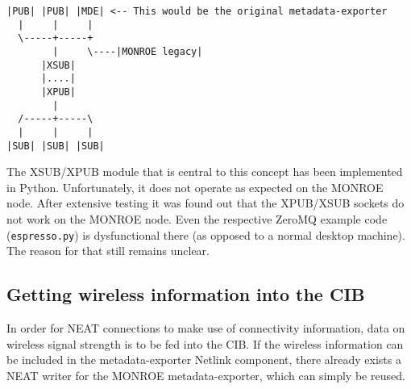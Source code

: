 \documentclass{scrartcl}
\begin{document}
\begin{verbatim}
|PUB| |PUB| |MDE| <-- This would be the original metadata-exporter
  |     |     |
  \-----+-----+
        |     \----|MONROE legacy|
      |XSUB|
      |....|
      |XPUB|
        |
  /-----+-----\
  |     |     |
|SUB| |SUB| |SUB|
\end{verbatim}

The XSUB/XPUB module that is central to this concept has been implemented in
Python. Unfortunately, it does not operate as expected on the MONROE node.
After extensive testing it was found out that the XPUB/XSUB sockets do not work
on the MONROE node. Even the respective ZeroMQ example code
(\verb#espresso.py#) is dysfunctional there (as opposed to a normal desktop
machine). The reason for that still remains unclear.

\subsection*{Getting wireless information into the CIB}

In order for NEAT connections to make use of connectivity information, data on
wireless signal strength is to be fed into the CIB. If the wireless information
can be included in the metadata-exporter Netlink component, there already
exists a NEAT writer for the MONROE metadata-exporter, which can simply be
reused.
\end{document}
